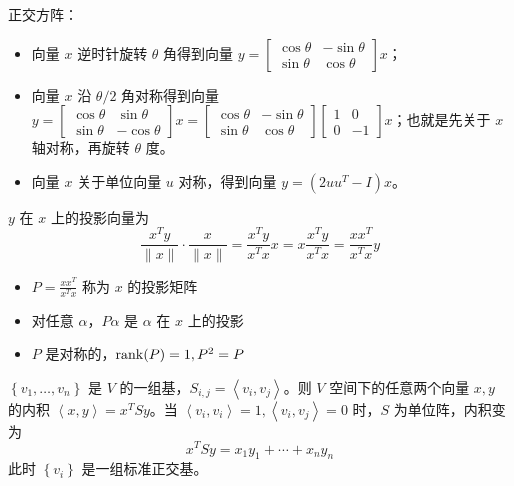 \begin{remark}
    正交方阵：
    \begin{itemize}
        \item 向量 $x$ 逆时针旋转 $\theta$ 角得到向量 $y = \begin{bmatrix}
            \cos\theta & -\sin\theta \\ 
            \sin\theta & \cos\theta
        \end{bmatrix}x$；
        \item 向量 $x$ 沿 $\theta/2$ 角对称得到向量 $y = \begin{bmatrix}
            \cos\theta & \sin\theta \\ 
            \sin\theta & -\cos\theta
        \end{bmatrix}x = \begin{bmatrix}
            \cos\theta & -\sin\theta \\ 
            \sin\theta & \cos\theta
        \end{bmatrix}\begin{bmatrix}
            1 & 0 \\
            0 & -1
        \end{bmatrix}x$；也就是先关于 $x$ 轴对称，再旋转 $\theta$ 度。
        \item 向量 $x$ 关于单位向量 $u$ 对称，得到向量 $y = (2uu^T-I)x$。
    \end{itemize}
\end{remark}

\begin{remark}
    $y$ 在 $x$ 上的投影向量为 \[\frac{x^{T} y}{\|x\|} \cdot \frac{x}{\|x\|}=\frac{x^{T} y}{x^{T} x} x=x \frac{x^{T} y}{x^{T} x}=\frac{x x^{T}}{x^{T} x} y\]
    \begin{itemize}
        \item $P = \frac{x x^{T}}{x^{T} x}$ 称为 $x$ 的投影矩阵
        \item 对任意 $\alpha$，$P\alpha$ 是 $\alpha$ 在 $x$ 上的投影
        \item $P$ 是对称的，$\rank(P) = 1, P^2 = P$
    \end{itemize}
\end{remark}

\begin{remark}
    $\left\{v_1, \dots, v_n\right\}$ 是 $V$ 的一组基，$S_{i, j} = \left\langle v_{i}, v_{j}\right\rangle$。则 $V$ 空间下的任意两个向量 $x, y$ 的内积 $\left\langle x, y\right\rangle=x^TSy$。当 $\left\langle v_{i}, v_{i}\right\rangle = 1, \left\langle v_{i}, v_{j}\right\rangle = 0$ 时，$S$ 为单位阵，内积变为 \[x^TSy = x_1y_1 + \cdots + x_ny_n\]
    此时 $\left\{v_i\right\}$ 是一组标准正交基。
\end{remark}

